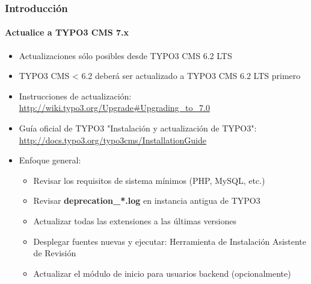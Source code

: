 \begin{frame}[fragile]
	\frametitle{Introducción}
	\framesubtitle{Actualice a TYPO3 CMS 7.x}

	\begin{itemize}
		\item Actualizaciones sólo posibles desde TYPO3 CMS 6.2 LTS
		\item TYPO3 CMS < 6.2 deberá ser actualizado a TYPO3 CMS 6.2 LTS primero
	\end{itemize}

	\begin{itemize}

		\item Instrucciones de actualización:\newline
			\smaller\url{http://wiki.typo3.org/Upgrade#Upgrading_to_7.0}\normalsize
		\item Guía oficial de TYPO3 "Instalación y actualización de TYPO3":
			\smaller\url{http://docs.typo3.org/typo3cms/InstallationGuide}\normalsize
		\item Enfoque general:
			\begin{itemize}
				\item Revisar los requisitos de sistema mínimos \small(PHP, MySQL, etc.)
				\item Revisar \textbf{deprecation\_*.log} en instancia antigua de TYPO3
				\item Actualizar todas las extensiones a las últimas versiones
				\item Desplegar fuentes nuevas y ejecutar:\newline
					Herramienta de Instalación \textrightarrow Asistente de Revisión
				\item Actualizar el módulo de inicio para usuarios backend (opcionalmente)
			\end{itemize}
	\end{itemize}

\end{frame}

